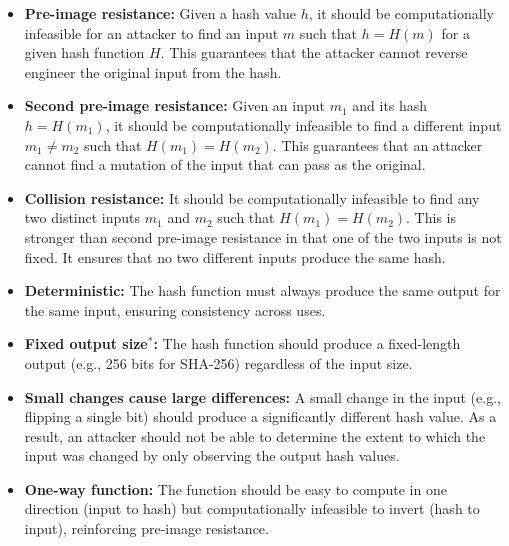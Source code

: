 \begin{itemize}
    \item \textbf{Pre-image resistance:} Given a hash value $h$, it should be
          computationally infeasible for an attacker to find an input $m$ such
          that $h = H(m)$ for a given hash function $H$. This guarantees that
          the attacker cannot reverse engineer the original input from the
          hash.

    \item \textbf{Second pre-image resistance:} Given an input $m_1$ and its
          hash $h = H(m_1)$, it should be computationally infeasible to find a
          different input $m_1 \neq m_2$ such that $H(m_1) = H(m_2)$. This
          guarantees that an attacker cannot find a mutation of the input that
          can pass as the original.

    \item \textbf{Collision resistance:} It should be computationally infeasible
          to find any two distinct inputs $m_1$ and $m_2$ such that $H(m_1) = H(m_2)$.
          This is stronger than second pre-image resistance in that one
          of the two inputs is not fixed. It ensures that no two different
          inputs produce the same hash.

    \item \textbf{Deterministic:} The hash function must always produce the
          same output for the same input, ensuring consistency across uses.

    \item \textbf{Fixed output size$^*$:} The hash function should produce a
          fixed-length output (e.g., 256 bits for SHA-256) regardless of the
          input size.

    \item \textbf{Small changes cause large differences:} A small change in
          the input (e.g., flipping a single bit) should produce a significantly
          different hash value. As a result, an attacker should not be able to
          determine the extent to which the input was changed by only observing
          the output hash values.

    \item \textbf{One-way function:} The function should be easy to compute in
          one direction (input to hash) but computationally infeasible to invert
          (hash to input), reinforcing pre-image resistance.
\end{itemize}

